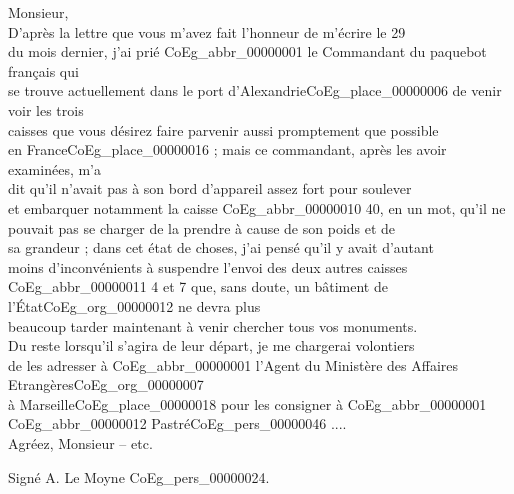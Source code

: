\documentclass{book}
\begin{document}
\hspace{1cm} Monsieur,\\

\indent D’après la lettre que vous m’avez fait l’honneur de m’écrire le 29\\
du mois dernier, j’ai prié \gls{CoEg_abbr_00000001} le Commandant du paquebot français qui\\
se trouve actuellement dans le port d’Alexandrie\gls{CoEg_place_00000006} de venir voir les trois\\
caisses que vous désirez faire parvenir aussi promptement que possible\\
en France\gls{CoEg_place_00000016} ; mais ce commandant, après les avoir examinées, m’a\\
dit qu’il n’avait pas à son bord d’appareil assez fort pour soulever\\
et embarquer notamment la caisse \gls{CoEg_abbr_00000010} 40, en un mot, qu’il ne\\
pouvait pas se charger de la prendre à cause de son poids et de\\
sa grandeur ; dans cet état de choses, j’ai pensé qu’il y avait d’autant\\
moins d’inconvénients à suspendre l’envoi des deux autres caisses\\
\gls{CoEg_abbr_00000011} 4 et 7 que, sans doute, un bâtiment de l’État\gls{CoEg_org_00000012} ne devra plus\\
beaucoup tarder maintenant à venir chercher tous vos monuments.\\
Du reste lorsqu’il s’agira de leur départ, je me chargerai volontiers\\
de les adresser à \gls{CoEg_abbr_00000001} l’Agent du Ministère des Affaires Etrangères\gls{CoEg_org_00000007}\\
à Marseille\gls{CoEg_place_00000018} pour les consigner à \gls{CoEg_abbr_00000001} \gls{CoEg_abbr_00000012} Pastré\gls{CoEg_pers_00000046} ....\\
\indent Agréez, Monsieur – etc.
\begin{center} \hspace{5cm} Signé A. Le Moyne \gls{CoEg_pers_00000024}.\end{center}
\end{document}
